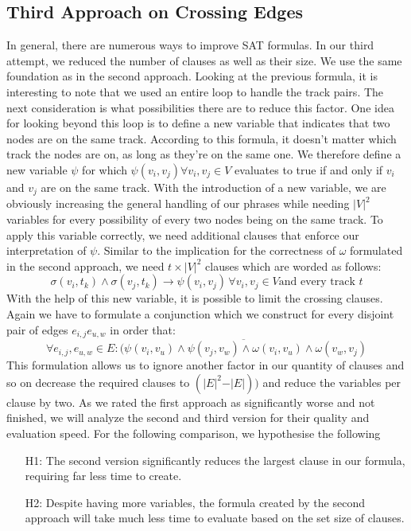 \documentclass[bachelor, english]{algothesis}
\begin{document}
\subsection{Third Approach on Crossing Edges}
\label{sec:approach2_2}
In general, there are numerous ways to improve SAT formulas. In our third attempt, we reduced the number of clauses as well as their size. We use the same foundation as in the second approach. Looking at the previous formula, it is interesting to note that we used an entire loop to handle the track pairs. The next consideration is what possibilities there are to reduce this factor. \newline
One idea for looking beyond this loop is to define a new variable that indicates that two nodes are on the same track. According to this formula, it doesn't matter which track the nodes are on, as long as they're on the same one. We therefore define a new variable $\psi$ for which $\psi(v_i,v_j) \forall v_i,v_j \in V$ evaluates to true if and only if $v_i$ and $v_j$ are on the same track. With the introduction of a new variable, we are obviously increasing the general handling of our phrases while needing ${\vert V \vert}^2$ variables for every possibility of every two nodes being on the same track. To apply this variable correctly, we need additional clauses that enforce our interpretation of $\psi$. Similar to the implication for the correctness of $\omega$ formulated in the second approach, we need $t \times {\vert V \vert}^2$ clauses which are worded as follows:
    $$ \sigma(v_i,t_k) \land \sigma(v_j,t_k)\rightarrow \psi(v_i,v_j) \, \forall v_i,v_j \in V \text{and every track }t$$
With the help of this new variable, it is possible to limit the crossing clauses. Again we have to formulate a conjunction which we construct for every disjoint pair of edges $e_{i,j} e_{u,w}$ in order that:
    $$ \forall e_{i,j}, e_{u,w} \in E : \overline{(\psi(v_i,v_u) \land \psi(v_j,v_w) \land   \omega(v_i,v_u) \land \omega(v_w,v_j)}$$
This formulation allows us to ignore another factor in our quantity of clauses and so on decrease the required clauses to $ (\vert E \vert^2 - \vert E \vert))$ and reduce the variables per clause by two. As we rated the first approach as significantly worse and not finished, we will analyze the second and third version for their quality and evaluation speed. For the following comparison, we hypothesise the following
\begin{enumerate}
    \item[H1:] The second version significantly reduces the largest clause in our formula, requiring far less time to create.
    \item[H2:] Despite having more variables, the formula created by the second approach will take much less time to evaluate based on the set size of clauses.
\end{enumerate}
\end{document}
